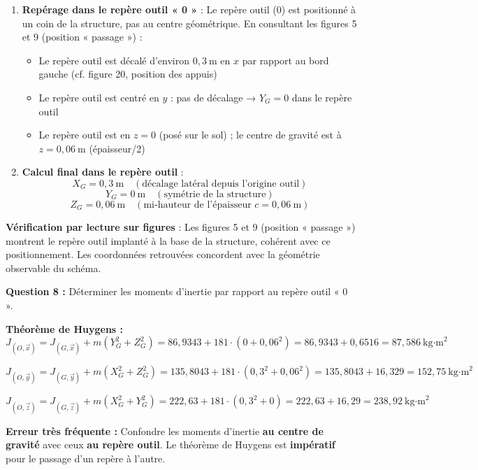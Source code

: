 \documentclass[12pt,a4paper,twoside]{article}
\begin{document}
\begin{correction}
\begin{enumerate}
    \item \textbf{Repérage dans le repère outil « 0 »} : Le repère outil (0) est positionné à un coin de la structure, pas au centre géométrique. En consultant les figures 5 et 9 (position « passage ») :
    \begin{itemize}
      \item Le repère outil est décalé d'environ $0,3~\text{m}$ en $x$ par rapport au bord gauche (cf. figure 20, position des appuis)
      \item Le repère outil est centré en $y$ : pas de décalage → $Y_G = 0$ dans le repère outil
      \item Le repère outil est en $z = 0$ (posé sur le sol) ; le centre de gravité est à $z = 0,06~\text{m}$ (épaisseur/2)
    \end{itemize}

    \item \textbf{Calcul final dans le repère outil} :
    \[
      X_G = 0,3~\text{m} \quad (\text{décalage latéral depuis l'origine outil})
    \]
    \[
      Y_G = 0~\text{m} \quad (\text{symétrie de la structure})
    \]
    \[
      Z_G = 0,06~\text{m} \quad (\text{mi-hauteur de l'épaisseur } c = 0,06~\text{m})
    \]
  \end{enumerate}

  \textbf{Vérification par lecture sur figures} : Les figures 5 et 9 (position « passage ») montrent le repère outil implanté à la base de la structure, cohérent avec ce positionnement. Les coordonnées retrouvées concordent avec la géométrie observable du schéma.

  \textbf{Question 8 :} Déterminer les moments d'inertie par rapport au repère outil « 0 ».

  \textbf{Théorème de Huygens :}
  \[
    J_{(O,\vec{x})} = J_{(G,\vec{x})} + m(Y_G^2 + Z_G^2) = 86,9343 + 181 \cdot (0 + 0,06^2) = 86,9343 + 0,6516 = 87,586~\text{kg·m}^2
  \]

  \[
    J_{(O,\vec{y})} = J_{(G,\vec{y})} + m(X_G^2 + Z_G^2) = 135,8043 + 181 \cdot (0,3^2 + 0,06^2) = 135,8043 + 16,329 = 152,75~\text{kg·m}^2
  \]

  \[
    J_{(O,\vec{z})} = J_{(G,\vec{z})} + m(X_G^2 + Y_G^2) = 222,63 + 181 \cdot (0,3^2 + 0) = 222,63 + 16,29 = 238,92~\text{kg·m}^2
  \]
\end{correction}

\begin{attention}
  \textbf{Erreur très fréquente :} Confondre les moments d'inertie \textbf{au centre de gravité} avec ceux \textbf{au repère outil}. Le théorème de Huygens est \textbf{impératif} pour le passage d'un repère à l'autre.
\end{attention}
\end{document}
